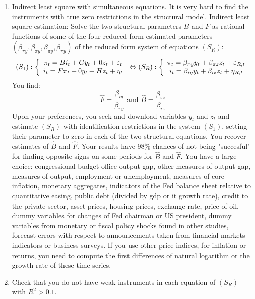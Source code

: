 \documentclass[12pt,a4paper]{article}%
\begin{document}
\begin{enumerate}
\item Indirect least square with simultaneous equations. It is very hard to
find the instruments with true zero restrictions in the structural model.
Indirect least square estimation: Solve the two structural parameters $B$ and
$F$ as rational functions of some of the four reduced form estimated
parameters $\left(  \beta_{\pi y},\beta_{\pi y},\beta_{\pi y},\beta_{\pi
y}\right)  $ of the reduced form system of equations $(S_{R})$:
\[
(S_{1}):\left\{
\begin{array}
[c]{c}%
\pi_{t}=Bi_{t}+Gy_{t}+0z_{t}+\varepsilon_{t}\\
i_{t}=F\pi_{t}+0y_{t}+Hz_{t}+\eta_{t}%
\end{array}
\right.  \Leftrightarrow(S_{R}):\left\{
\begin{array}
[c]{c}%
\pi_{t}=\beta_{\pi y}y_{t}+\beta_{\pi z}z_{t}+\varepsilon_{R,t}\\
i_{t}=\beta_{iy}y_{t}+\beta_{iz}z_{t}+\eta_{R,t}%
\end{array}
\right.
\]
You find:%
\[
\widehat{F}=\frac{\beta_{iy}}{\beta_{\pi y}}\text{ and }\widehat{B}%
=\frac{\beta_{\pi z}}{\beta_{iz}}%
\]
Upon your preferences, you seek and download variables $y_{t}$ and $z_{t}$ and
estimate $(S_{R})$ with identification restrictions in the system $(S_{1})$,
setting their parameter to zero in each of the two structural equations. You
recover estimates of $\widehat{B}$ and $\widehat{F}$. Your results have 98\%
chances of not being "succesful" for finding opposite signs on some periods
for $\widehat{B}$ and $\widehat{F}$. You have a large choice: congressional
budget office output gap, other measures of output gap, measures of output,
employment or unemployment, measures of core inflation, monetary aggregates,
indicators of the Fed balance sheet relative to quantitative easing, public
debt (divided by gdp or it growth rate), credit to the private sector, asset
prices, housing prices, exchange rate, price of oil, dummy variables for
changes of Fed chairman or US president, dummy variables from monetary or
fiscal policy shocks found in other studies, forecast errors with respect to
announcements taken from financial markets indicators or business surveys. If
you use other price indices, for inflation or returns, you need to compute the
first differences of natural logarithm or the growth rate of these time series.

\item Check that you do not have weak instruments in each equation of
$(S_{R})$ with $R^{2}>0.1$.


\end{enumerate}
\end{document}
